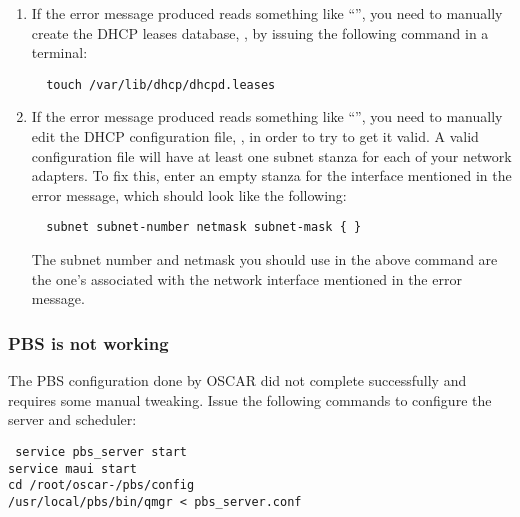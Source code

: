 \begin{enumerate}
\item If the error message produced reads something like
  ``'', you need to manually create
  the DHCP leases database, , by
  issuing the following command in a terminal:

\begin{verbatim}
  touch /var/lib/dhcp/dhcpd.leases
\end{verbatim}
  
\item If the error message produced reads something like ``'', you need to manually edit the DHCP
  configuration file, , in order to try to get
  it valid. A valid configuration file will have at least one subnet
  stanza for each of your network adapters. To fix this, enter an
  empty stanza for the interface mentioned in the error message, which
  should look like the following:

\begin{verbatim}
  subnet subnet-number netmask subnet-mask { }
\end{verbatim}
  
  The subnet number and netmask you should use in the above command
  are the one's associated with the network interface mentioned in the
  error message.
\end{enumerate}

\subsubsection{PBS is not working}

The PBS configuration done by OSCAR did not complete successfully and
requires some manual tweaking. Issue the following commands to
configure the server and scheduler:

\begchange
\vspace{11pt}
{\tt
  service pbs\_server start \\
\indent  service maui start \\
\indent  cd /root/oscar-\oscarversion/pbs/config \\
\indent  /usr/local/pbs/bin/qmgr < pbs\_server.conf
}
\vspace{11pt}


